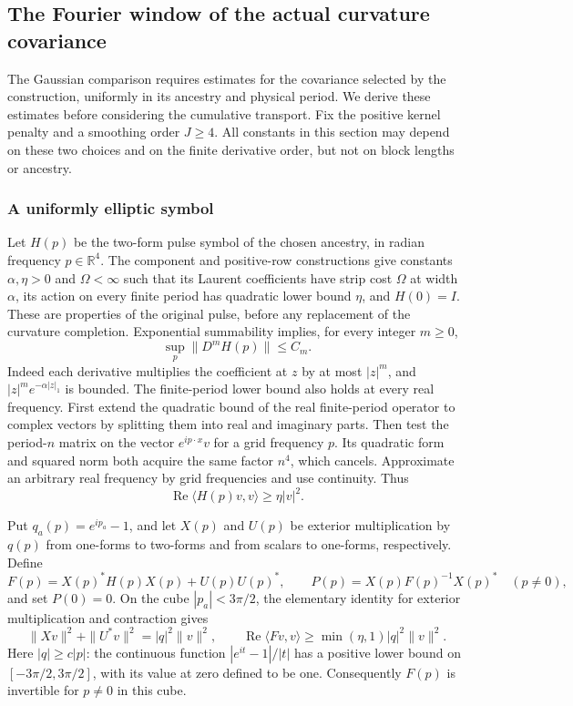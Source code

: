 \subsection{The Fourier window of the actual curvature covariance}
\label{sec:actual-covariance-fourier-window}

The Gaussian comparison requires estimates for the covariance selected
by the construction, uniformly in its ancestry and physical period.
We derive these estimates before considering the cumulative transport.
Fix the positive kernel penalty and a smoothing order $J\ge4$.
All constants in this section may depend on these two choices and on
the finite derivative order, but not on block lengths or ancestry.

\subsubsection{A uniformly elliptic symbol}

Let $H(p)$ be the two-form pulse symbol of the chosen ancestry, in
radian frequency $p\in\mathbb R^4$. The component and positive-row
constructions give constants $\alpha,\eta>0$ and $\Omega<\infty$
such that its Laurent coefficients have strip cost $\Omega$ at
width $\alpha$, its action on every finite period has quadratic
lower bound $\eta$, and $H(0)=I$. These are properties of the
original pulse, before any replacement of the curvature completion.
Exponential summability implies, for every integer $m\ge0$,
\[
 \sup_p\|D^mH(p)\|\le C_m.
\]
Indeed each derivative multiplies the coefficient at $z$ by at most
$|z|^m$, and $|z|^m e^{-\alpha|z|_1}$ is bounded. The finite-period
lower bound also holds at every real frequency. First extend the
quadratic bound of the real finite-period operator to complex vectors
by splitting them into real and imaginary parts. Then test
the period-$n$ matrix on the vector $e^{ip\cdot x}v$ for a grid
frequency $p$. Its quadratic form and squared norm both acquire the
same factor $n^4$, which cancels. Approximate an arbitrary real
frequency by grid frequencies and use continuity. Thus
\[
       \operatorname{Re}\langle H(p)v,v\rangle\ge\eta|v|^2.
\]

Put $q_a(p)=e^{ip_a}-1$, and let $X(p)$ and $U(p)$ be exterior
multiplication by $q(p)$ from one-forms to two-forms and from
scalars to one-forms, respectively. Define
\[
 F(p)=X(p)^*H(p)X(p)+U(p)U(p)^*,\qquad
 P(p)=X(p)F(p)^{-1}X(p)^*\quad(p\ne0),
\]
and set $P(0)=0$. On the cube $|p_a|<3\pi/2$, the elementary
identity for exterior multiplication and contraction gives
\[
 \|Xv\|^2+\|U^*v\|^2=|q|^2\|v\|^2,
 \qquad
 \operatorname{Re}\langle Fv,v\rangle
       \ge\min(\eta,1)|q|^2\|v\|^2.
\]
Here $|q|\ge c|p|$: the continuous function
$|e^{it}-1|/|t|$ has a positive lower bound on
$[-3\pi/2,3\pi/2]$, with its value at zero defined to be one.
Consequently $F(p)$ is invertible for $p\ne0$ in this cube.

